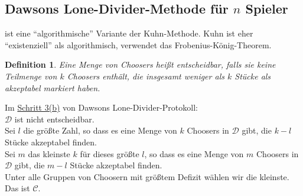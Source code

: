 \documentclass[a4paper,10pt]{scrartcl}
\newtheorem*{definition*}{Definition}
\begin{document}
\subsection{Dawsons Lone-Divider-Methode für $n$ Spieler}
ist eine ``algorithmische'' Variante der Kuhn-Methode.
Kuhn ist eher ``existenziell'' als algorithmisch, verwendet das Frobenius-König-Theorem.
\begin{definition*}
 Eine Menge von Choosers heißt entscheidbar, falls sie keine Teilmenge von $k$ Choosers enthält, die insgesamt weniger als $k$ Stücke als
 akzeptabel markiert haben.
\end{definition*}
Im \underline{Schritt 3(b)} von Dawsons Lone-Divider-Protokoll:\\
$\mathcal{D}$ ist nicht entscheidbar.\\
Sei $l$ die größte Zahl, so dass es eine Menge von $k$ Choosers in $\mathcal{D}$ gibt, die $k-l$ Stücke akzeptabel finden.\\
Sei $m$ das kleinste $k$ für dieses größte $l$, 
so dass es eine Menge von $m$ Choosers in $\mathcal{D}$ gibt, die $m-l$ Stücke akzeptabel finden.\\
Unter alle Gruppen von Choosern mit größtem Defizit wählen wir die kleinste.\\
Das ist $\mathcal{C}$.
\end{document}
